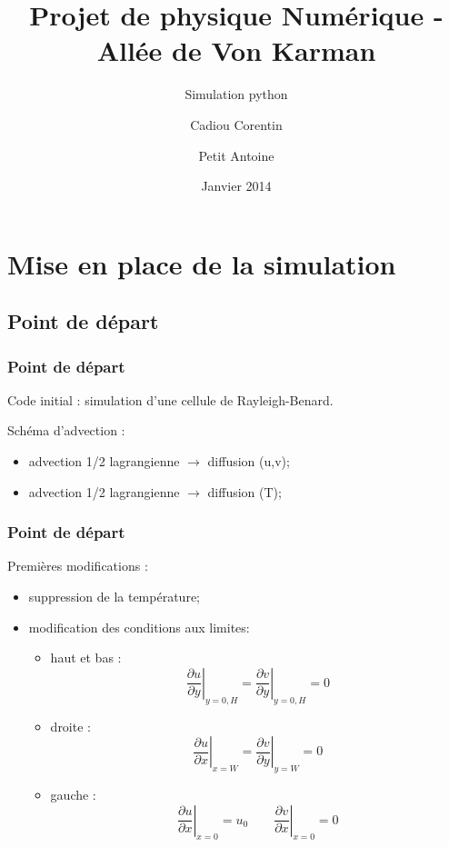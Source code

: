 \documentclass{beamer}
\title{Projet de physique Numérique - Allée de Von Karman}
\subtitle{Simulation python}
\author[Cadiou Corentin \and Petit Antoine]
{Cadiou Corentin \and Petit Antoine}
\date{Janvier 2014}
\begin{document}
  \frame{\titlepage}

  \section{Mise en place de la simulation}
  \subsection{Point de départ}
  \begin{frame}
    \frametitle{Point de départ}
    Code initial : simulation d'une cellule de Rayleigh-Benard.

    Schéma d'advection :
    \begin{itemize}
      \item advection 1/2 lagrangienne $\rightarrow$ diffusion (u,v);
      \item advection 1/2 lagrangienne $\rightarrow$ diffusion (T);
    \end{itemize}
  \end{frame}
  \begin{frame}
    \frametitle{Point de départ}
    Premières modifications :
    \begin{itemize}
      \item<1-> suppression de la température;
      \item<2-> modification des conditions aux limites:
        \begin{itemize}
          \item<3-> haut et bas : 
            \[ \left. \frac{\partial u}{\partial y}\right|_{y=0,H} = 
            \left. \frac{\partial v}{\partial y}\right|_{y=0,H} = 0 \] 
          \item<4-> droite :
            \[ \left. \frac{\partial u}{\partial x}\right|_{x=W} = 
            \left. \frac{\partial v}{\partial y}\right|_{y=W} = 0 \]
          \item<5-> gauche :
            \[ \left. \frac{\partial u}{\partial x}\right|_{x=0} = u_0
            \qquad \left. \frac{\partial v}{\partial x}\right|_{x=0} = 0\]
        \end{itemize}
    \end{itemize}
  \end{frame}
\end{document}
